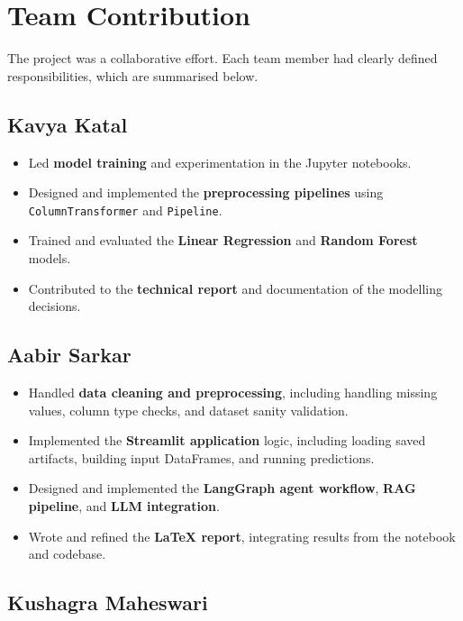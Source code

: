 \documentclass[11pt,a4paper]{article}
\begin{document}
\section{Team Contribution}

The project was a collaborative effort. Each team member had clearly defined responsibilities, which are summarised below.

\subsection*{Kavya Katal}

\begin{itemize}[leftmargin=*]
    \item Led \textbf{model training} and experimentation in the Jupyter notebooks.
    \item Designed and implemented the \textbf{preprocessing pipelines} using \texttt{ColumnTransformer} and \texttt{Pipeline}.
    \item Trained and evaluated the \textbf{Linear Regression} and \textbf{Random Forest} models.
    \item Contributed to the \textbf{technical report} and documentation of the modelling decisions.
\end{itemize}

\subsection*{Aabir Sarkar}

\begin{itemize}[leftmargin=*]
    \item Handled \textbf{data cleaning and preprocessing}, including handling missing values, column type checks, and dataset sanity validation.
    \item Implemented the \textbf{Streamlit application} logic, including loading saved artifacts, building input DataFrames, and running predictions.
    \item Designed and implemented the \textbf{LangGraph agent workflow}, \textbf{RAG pipeline}, and \textbf{LLM integration}.
    \item Wrote and refined the \textbf{LaTeX report}, integrating results from the notebook and codebase.
\end{itemize}

\subsection*{Kushagra Maheswari}
\end{document}
